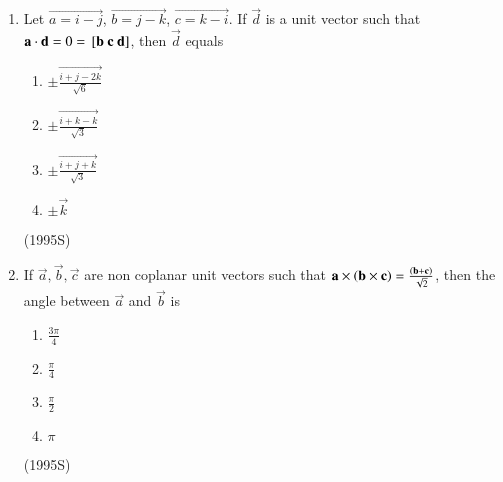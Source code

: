 \documentclass[journal]{IEEEtran}
\begin{document}
\begin{enumerate}
\item Let $\vec{a=i-j}$, $\vec{b=j-k}$, $\vec{c=k-i}$. If $\vec{d}$ is a unit vector such that $\vec{a}\cdot\vec{d} = 0 = \sbrak{\vec{b}\ \vec{c}\ \vec{d}}$, then $\vec{d}$ equals
\begin{enumerate}
\item $\pm \vec{\frac{{i+j-2k}}{\sqrt{6}}}$
\item $\pm \vec{\frac{{i+k-k}}{\sqrt{3}}}$
\item $\pm \vec{\frac{{i+j+k}}{\sqrt{3}}}$
\item $\pm \vec{k}$
\end{enumerate}
\hfill (1995S)

\item If $\vec{a},\vec{b},\vec{c}$ are non coplanar unit vectors such that $\mathbf{a}\times\left(\mathbf{b}\times\mathbf{c}\right) = \frac{\left(\mathbf{b}+\mathbf{c}\right)}{\sqrt{2}}$, then the angle between $\vec{a}$ and $\vec{b}$ is
\begin{enumerate}
\item $\frac{3\pi}{4}$
\item $\frac{\pi}{4}$
\item $\frac{\pi}{2}$
\item $\pi$
\end{enumerate}
\hfill (1995S)
\end{enumerate}
\end{document}
